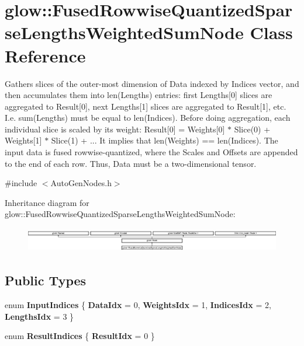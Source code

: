 \hypertarget{classglow_1_1_fused_rowwise_quantized_sparse_lengths_weighted_sum_node}{}\section{glow\+:\+:Fused\+Rowwise\+Quantized\+Sparse\+Lengths\+Weighted\+Sum\+Node Class Reference}
\label{classglow_1_1_fused_rowwise_quantized_sparse_lengths_weighted_sum_node}


Gathers slices of the outer-\/most dimension of Data indexed by Indices vector, and then accumulates them into len(\+Lengths) entries\+: first Lengths\mbox{[}0\mbox{]} slices are aggregated to Result\mbox{[}0\mbox{]}, next Lengths\mbox{[}1\mbox{]} slices are aggregated to Result\mbox{[}1\mbox{]}, etc. I.\+e. sum(\+Lengths) must be equal to len(\+Indices). Before doing aggregation, each individual slice is scaled by its weight\+: Result\mbox{[}0\mbox{]} = Weights\mbox{[}0\mbox{]} $\ast$ Slice(0) + Weights\mbox{[}1\mbox{]} $\ast$ Slice(1) + ... It implies that len(\+Weights) == len(\+Indices). The input data is fused rowwise-\/quantized, where the Scales and Offsets are appended to the end of each row. Thus, Data must be a two-\/dimensional tensor.  




{\ttfamily \#include $<$Auto\+Gen\+Nodes.\+h$>$}

Inheritance diagram for glow\+:\+:Fused\+Rowwise\+Quantized\+Sparse\+Lengths\+Weighted\+Sum\+Node\+:\begin{figure}[H]
\begin{center}
\leavevmode
\includegraphics[height=1.096606cm]{classglow_1_1_fused_rowwise_quantized_sparse_lengths_weighted_sum_node}
\end{center}
\end{figure}
\subsection*{Public Types}
\begin{DoxyCompactItemize}
\item 
\mbox{\label{classglow_1_1_fused_rowwise_quantized_sparse_lengths_weighted_sum_node_a5f5fc2f17fd2c4bda6563bd23316a96a}} 
enum {\bfseries Input\+Indices} \{ {\bfseries Data\+Idx} = 0, 
{\bfseries Weights\+Idx} = 1, 
{\bfseries Indices\+Idx} = 2, 
{\bfseries Lengths\+Idx} = 3
 \}
\item 
\mbox{\label{classglow_1_1_fused_rowwise_quantized_sparse_lengths_weighted_sum_node_a0e35f26110b7b17d2987439ea6895103}} 
enum {\bfseries Result\+Indices} \{ {\bfseries Result\+Idx} = 0
 \}
\end{DoxyCompactItemize}
